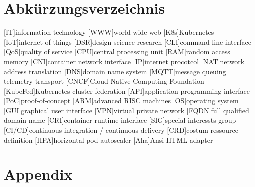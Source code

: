 \documentclass[MSC,Master,english]{twbook}%
\providecommand\listacroname{}
\renewcommand\listacroname{List of Abbreviations}
\renewcommand\listacroname{Abkürzungsverzeichnis}
\begin{document}
\chapter*{\listacroname}
\begin{acronym}[XXXXX]
    [IT]{information technology}
    [WWW]{world wide web}
    [K8s]{Kubernetes}
    [IoT]{internet-of-things}
    [DSR]{design science research}
    [CLI]{command line interface}
    [QoS]{quality of service}
    [CPU]{central processing unit}
    [RAM]{random access memory}
    [CNI]{container network interface}
    [IP]{internet procotcol}
    [NAT]{network address translation}
    [DNS]{domain name system}
    [MQTT]{message queuing telemetry transport}
    [CNCF]{Cloud Native Computing Foundation}
    [KubeFed]{Kubernetes cluster federation}
    [API]{application programming interface}
    [PoC]{proof-of-concept}
    [ARM]{advanced RISC machines}
    [OS]{operating system}
    [GUI]{graphical user interface}
    [VPN]{virtual private network}
    [FQDN]{full qualified domain name}
    [CRI]{container runtime interface}
    [SIG]{special interessts group}
    [CI/CD]{continuous integration / continuous delivery}
    [CRD]{costum ressource definition}
    [HPA]{horizontal pod autoscaler}
    [Aha]{Ansi HTML adapter}
\end{acronym}

%
%
\clearpage
\appendix
\chapter{Appendix}
\label{appendix}
\end{document}
